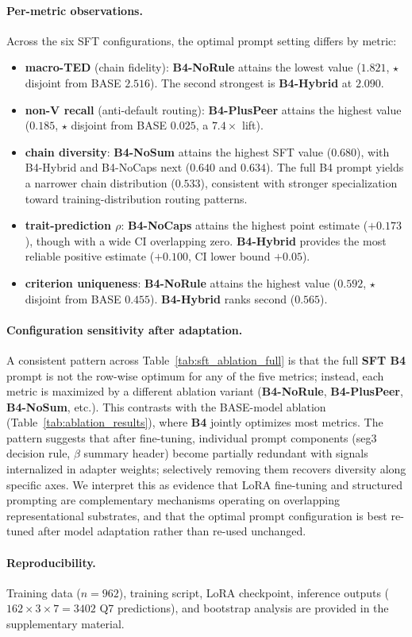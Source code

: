 \paragraph{Per-metric observations.}
Across the six SFT configurations, the optimal prompt setting differs by metric:

\begin{itemize}[leftmargin=*,itemsep=2pt]
\item \textbf{macro-TED} (chain fidelity): \textbf{B4-NoRule} attains the lowest value
  ($1.821$, $\star$ disjoint from BASE $2.516$). The second strongest is \textbf{B4-Hybrid}
  at $2.090$.
\item \textbf{non-V recall} (anti-default routing): \textbf{B4-PlusPeer} attains the highest
  value ($0.185$, $\star$ disjoint from BASE $0.025$, a $7.4\times$ lift).
\item \textbf{chain diversity}: \textbf{B4-NoSum} attains the highest SFT value
  ($0.680$), with B4-Hybrid and B4-NoCaps next ($0.640$ and $0.634$). The full B4 prompt
  yields a narrower chain distribution ($0.533$), consistent with stronger specialization
  toward training-distribution routing patterns.
\item \textbf{trait-prediction $\rho$}: \textbf{B4-NoCaps} attains the highest point estimate
  ($+0.173$), though with a wide CI overlapping zero. \textbf{B4-Hybrid} provides the most
  reliable positive estimate ($+0.100$, CI lower bound $+0.05$).
\item \textbf{criterion uniqueness}: \textbf{B4-NoRule} attains the highest value
  ($0.592$, $\star$ disjoint from BASE $0.455$). \textbf{B4-Hybrid} ranks second ($0.565$).
\end{itemize}

\paragraph{Configuration sensitivity after adaptation.}
A consistent pattern across Table~\ref{tab:sft_ablation_full} is that the full
\textbf{SFT B4} prompt is not the row-wise optimum for any of the five metrics; instead,
each metric is maximized by a different ablation variant (\textbf{B4-NoRule},
\textbf{B4-PlusPeer}, \textbf{B4-NoSum}, etc.). This contrasts with the BASE-model
ablation (Table~\ref{tab:ablation_results}), where \textbf{B4} jointly optimizes most
metrics. The pattern suggests that after fine-tuning, individual prompt components
(seg3 decision rule, $\beta$ summary header) become partially redundant with signals
internalized in adapter weights; selectively removing them recovers diversity along
specific axes. We interpret this as evidence that LoRA fine-tuning and structured
prompting are complementary mechanisms operating on overlapping representational
substrates, and that the optimal prompt configuration is best re-tuned after model
adaptation rather than re-used unchanged.

\paragraph{Reproducibility.}
Training data ($n = 962$), training script, LoRA checkpoint, inference outputs
($162 \times 3 \times 7 = 3402$ Q7 predictions), and bootstrap analysis are
provided in the supplementary material.
